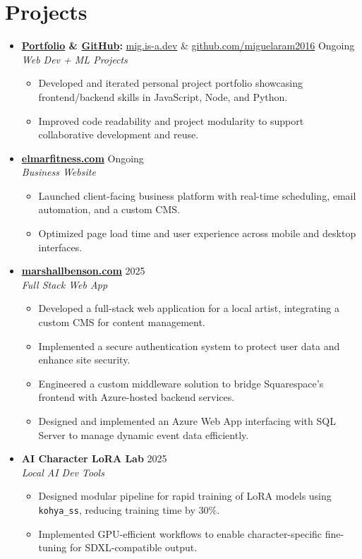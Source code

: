 \documentclass[letterpaper,10pt]{article}
\newcommand{\resumeItem}[1]{\item\small{#1}}
\begin{document}
\section*{Projects}
\begin{itemize}[leftmargin=0in]
  \item[]
    \textbf{\href{https://mig.is-a.dev}{Portfolio} \& \href{https://github.com/miguelaram2016}{GitHub}:} \href{https://mig.is-a.dev}{mig.is-a.dev} \& \href{https://github.com/miguelaram2016}{github.com/miguelaram2016} \hfill Ongoing \\
    \textit{Web Dev + ML Projects}
    \begin{itemize}[leftmargin=0.15in]
      \resumeItem{Developed and iterated personal project portfolio showcasing frontend/backend skills in JavaScript, Node, and Python.}
      \resumeItem{Improved code readability and project modularity to support collaborative development and reuse.}
    \end{itemize}

  \item[]
    \textbf{\href{https://elmarfitness.com}{elmarfitness.com}} \hfill Ongoing \\
    \textit{Business Website}
    \begin{itemize}[leftmargin=0.15in]
      \resumeItem{Launched client-facing business platform with real-time scheduling, email automation, and a custom CMS.}
      \resumeItem{Optimized page load time and user experience across mobile and desktop interfaces.}
    \end{itemize}

    \item[]
    \textbf{\href{https://marshallbenson.com}{marshallbenson.com}} \hfill 2025 \\
    \textit{Full Stack Web App}
    \begin{itemize}[leftmargin=0.15in]
      \resumeItem{Developed a full-stack web application for a local artist, integrating a custom CMS for content management.}
      \resumeItem{Implemented a secure authentication system to protect user data and enhance site security.}
      \resumeItem{Engineered a custom middleware solution to bridge Squarespace's frontend with Azure-hosted backend services.}
      \resumeItem{Designed and implemented an Azure Web App interfacing with SQL Server to manage dynamic event data efficiently.}
    \end{itemize}
    
  \item[]
    \textbf{AI Character LoRA Lab} \hfill 2025 \\
    \textit{Local AI Dev Tools}
    \begin{itemize}[leftmargin=0.15in]
      \resumeItem{Designed modular pipeline for rapid training of LoRA models using \texttt{kohya\_ss}, reducing training time by 30\%.}
      \resumeItem{Implemented GPU-efficient workflows to enable character-specific fine-tuning for SDXL-compatible output.}
    \end{itemize}
\end{itemize}
\end{document}
